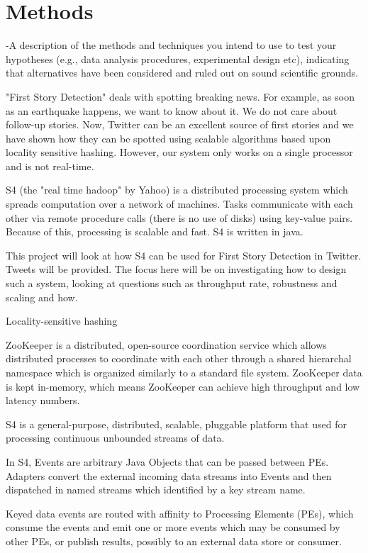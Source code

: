 \documentclass[a4paper,12pt]{article}
\begin{document}
\section{Methods}

-A description of the methods and techniques you intend to use to test your hypotheses (e.g., data analysis procedures, experimental design etc), indicating that alternatives have been considered and ruled out on sound scientific grounds.

"First Story Detection" deals with spotting breaking news. For example, as soon as an earthquake happens, we want to know about it. We do not care about follow-up stories. Now, Twitter can be an excellent source of first stories and we have shown how they can be spotted using scalable algorithms based upon locality sensitive hashing. However, our system only works on a single processor and is not real-time.

S4 (the "real time hadoop" by Yahoo) is a distributed processing system which spreads computation over a network of machines. Tasks communicate with each other via remote procedure calls (there is no use of disks) using key-value pairs. Because of this, processing is scalable and fast. S4 is written in java.

This project will look at how S4 can be used for First Story Detection in Twitter. Tweets will be provided. The focus here will be on investigating how to design such a system, looking at questions such as throughput rate, robustness and scaling and how.


Locality-sensitive hashing


ZooKeeper is a distributed, open-source coordination service which allows distributed processes to coordinate with each other through a shared hierarchal namespace which is organized similarly to a standard file system.  
ZooKeeper data is kept in-memory, which means ZooKeeper can achieve high throughput and low latency numbers.


S4 is a general-purpose, distributed, scalable, pluggable platform that used for processing continuous unbounded streams of data. 



In S4, Events are arbitrary Java Objects that can be passed between PEs. Adapters convert the external incoming data streams into Events and then dispatched in named streams which identified by a key stream name.

Keyed data events are routed with affinity to Processing Elements (PEs), which consume the events and emit one or more events which may be consumed by other PEs, or publish results, possibly to an external data store or consumer.
\end{document}
